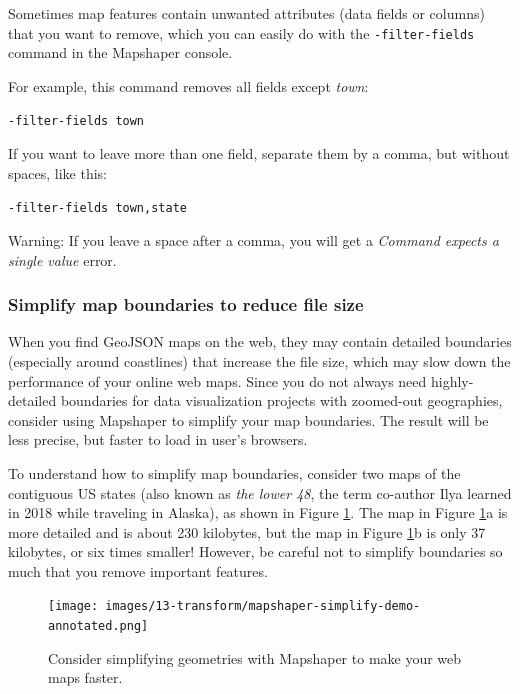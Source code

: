 \documentclass[
  english,
]{book}
\begin{document}
Sometimes map features contain unwanted attributes (data fields or columns) that you want to remove, which you can easily do with the \texttt{-filter-fields} command in the Mapshaper console.

For example, this command removes all fields except \emph{town}:

\texttt{-filter-fields\ town}

If you want to leave more than one field, separate them by a comma, but without spaces, like this:

\texttt{-filter-fields\ town,state}

Warning: If you leave a space after a comma, you will get a \emph{Command expects a single value} error.

\hypertarget{simplify-map-boundaries-to-reduce-file-size}{%
\subsubsection*{Simplify map boundaries to reduce file size}\label{simplify-map-boundaries-to-reduce-file-size}}

When you find GeoJSON maps on the web, they may contain detailed boundaries (especially around coastlines) that increase the file size, which may slow down the performance of your online web maps. Since you do not always need highly-detailed boundaries for data visualization projects with zoomed-out geographies, consider using Mapshaper to simplify your map boundaries. The result will be less precise, but faster to load in user's browsers.

To understand how to simplify map boundaries, consider two maps of the contiguous US states (also known as \emph{the lower 48},
the term co-author Ilya learned in 2018 while traveling in Alaska), as shown in Figure \ref{fig:mapshaper-simplify-demo}.
The map in Figure \ref{fig:mapshaper-simplify-demo}a is more detailed and is about 230 kilobytes, but the map in Figure \ref{fig:mapshaper-simplify-demo}b
is only 37 kilobytes, or six times smaller! However, be careful not to simplify boundaries so much that you remove important features.



\begin{figure}
\centering
\texttt{[image: images/13-transform/mapshaper-simplify-demo-annotated.png]}
\caption{\label{fig:mapshaper-simplify-demo}Consider simplifying geometries with Mapshaper to make your web maps faster.}
\end{figure}
\end{document}
